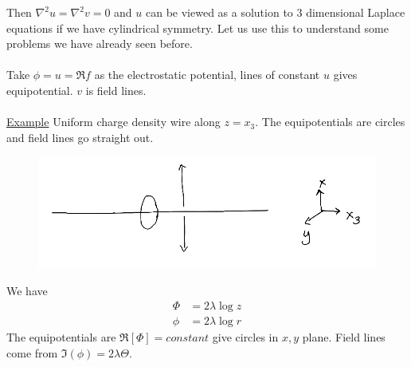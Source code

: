 \documentclass[a4paper,12pt]{article}
\begin{document}
Then $\nabla^2u=\nabla^2 v=0$ and $u$ can be viewed as a solution to 3 dimensional Laplace equations if we have cylindrical symmetry. Let us use this to understand some problems we have already seen before.\\\\
Take $\phi=u= \Re f$ as the electrostatic potential, lines of constant $u$ gives equipotential. $v$ is field lines.\\\\
\underline{Example}
Uniform charge density wire along $z=x_3$. The equipotentials are circles and field lines go straight out.
\begin{figure}[H]
	\centering
	\includegraphics[width=0.7\linewidth]{4}
	\caption{}
	\label{fig:4}
\end{figure}
We have
\begin{equation}
\begin{aligned}
\Phi&=2\lambda \log z\\
\phi&=2\lambda \log r
\end{aligned}
\end{equation}
The equipotentials are $\Re[\Phi]=constant$ give circles in $x,y$ plane. Field lines come from $\Im(\phi)=2\lambda \Theta$.
\end{document}
